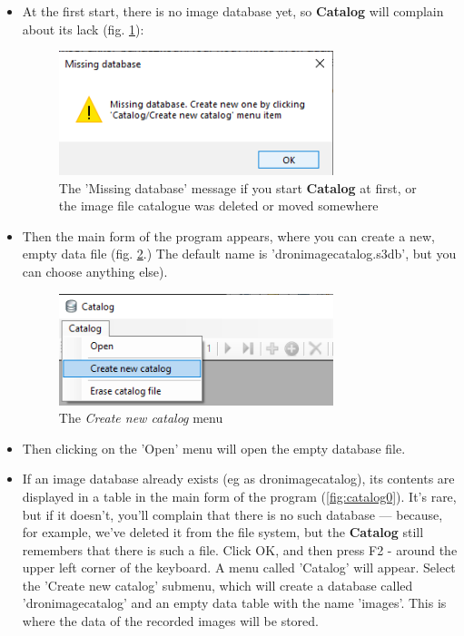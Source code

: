 \documentclass[a4paper,12pt]{article}
\begin{document}
\begin{itemize}
	

\item At the first start, there is no image database yet, so \textbf{Catalog} will complain about its lack (fig. \ref {fig:missingdb}): 

\begin{figure}
	\centering
	\includegraphics[width=8cm]{missingdb.png}
	\caption{The 'Missing database' message if you start \textbf{Catalog} at first, or the image file catalogue was deleted or moved somewhere}
	\label{fig:missingdb}
\end{figure}

\item Then the main form of the program appears, where you can create a new, empty data file (fig. \ref {fig:createnewcatalog}.) The default name is 'dronimagecatalog.s3db', but you can choose anything else). 

\begin{figure}
	\centering
	\includegraphics[width=8cm]{createnewcatalog.png}
	\caption{The \textit{Create new catalog} menu}
	\label{fig:createnewcatalog}
\end{figure}

\item Then clicking on the 'Open' menu will open the empty database file. 

\item If an image database already exists (eg as dronimagecatalog), its contents are displayed in a table in the main form of the program (\ref{fig:catalog0}). It's rare, but if it doesn't, you'll complain that there is no such database — because, for example, we've deleted it from the file system, but the \textbf{Catalog} still remembers that there is such a file. Click OK, and then press F2 - around the upper left corner of the keyboard. A menu called 'Catalog' will appear. Select the 'Create new catalog' submenu, which will create a database called 'dronimagecatalog' and an empty data table with the name 'images'. This is where the data of the recorded images will be stored. 


\end{itemize}
\end{document}

